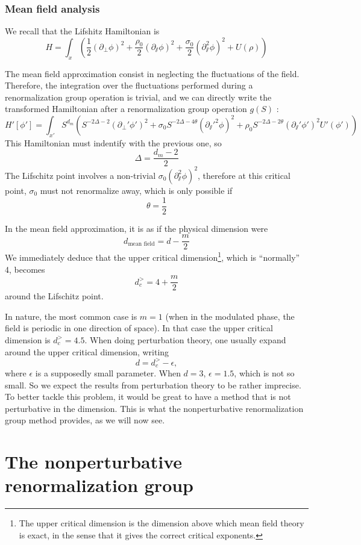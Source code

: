 \subsubsection{Mean field analysis}

We recall that the Lifshitz Hamiltonian is
\begin{equation}
H = \int_x \left( \frac{1}{2}(\partial_\perp \phi)^2 + \frac{\rho_0}{2} (\partial_\sslash \phi)^2 + \frac{\sigma_0}{2} (\partial_\sslash^2 \phi)^2 + U(\rho) \right)
\end{equation}

The mean field approximation consist in neglecting the fluctuations of the field. Therefore, the integration over the fluctuations performed during a renormalization group operation is trivial, and we can directly write the transformed Hamiltonian after a renormalization group operation $g(S)$ :
\begin{equation}
H'[\phi'] = \int_{x'} S^{d_m} \left( S^{-2\Delta -2} (\partial_\perp' \phi')^2 + \sigma_0 S^{-2\Delta - 4 \theta} (\partial_\sslash'^2 \phi)^2 + \rho_0 S^{-2\Delta -2 \theta} (\partial_\sslash' \phi')^2 U'(\phi') \right)
\end{equation}
This Hamiltonian must indentify with the previous one, so
\begin{equation}
\Delta = \frac{d_m -2}{2}
\end{equation}
The Lifschitz point involves a non-trivial $\sigma_0 (\partial_\sslash^2 \phi)^2$, therefore at this critical point, $\sigma_0$ must not renormalize away, which is only possible if
\begin{equation}
\theta = \frac{1}{2}
\end{equation}

In the mean field approximation, it is as if the physical dimension were
\begin{equation}
d_{\text{mean field}} = d - \frac{m}{2}
\end{equation}
We immediately deduce that the upper critical dimension\footnote{The upper critical dimension is the dimension above which mean field theory is exact, in the sense that it gives the correct critical exponents.}, which is ``normally'' 4, becomes
\begin{equation}
d_c^> = 4 + \frac{m}{2}
\end{equation}
around the Lifschitz point.

In nature, the most common case is $m=1$ (when in the modulated phase, the field is periodic in one direction of space). In that case the upper critical dimension is $d_c^> = 4.5$. When doing perturbation theory, one usually expand around the upper critical dimension, writing
\begin{equation}
d = d_c^> - \epsilon,
\end{equation} 
where $\epsilon$ is a supposedly small parameter. When $d=3$, $\epsilon = 1.5$, which is not so small. So we expect the results from perturbation theory to be rather imprecise. To better tackle this problem, it would be great to have a method that is not perturbative in the dimension. This is what the nonperturbative renormalization group method provides, as we will now see.

\section{The nonperturbative renormalization group}

